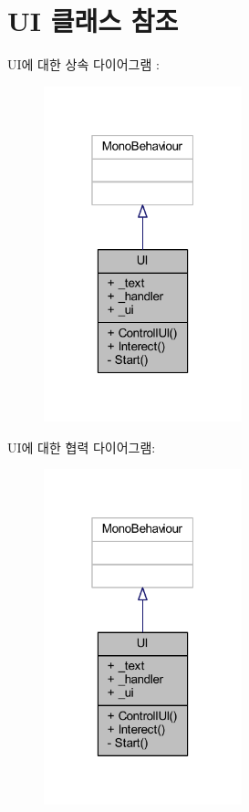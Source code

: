\hypertarget{class_u_i}{}\section{UI 클래스 참조}
\label{class_u_i}


U\+I에 대한 상속 다이어그램 \+: \nopagebreak
\begin{figure}[H]
\begin{center}
\leavevmode
\includegraphics[width=163pt]{da/d1c/class_u_i__inherit__graph}
\end{center}
\end{figure}


U\+I에 대한 협력 다이어그램\+:\nopagebreak
\begin{figure}[H]
\begin{center}
\leavevmode
\includegraphics[width=163pt]{d4/dc3/class_u_i__coll__graph}
\end{center}
\end{figure}
